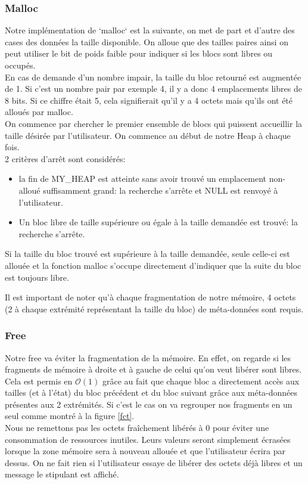 \documentclass{article}
\begin{document}
\subsubsection{Malloc}
Notre implémentation de `malloc` est la suivante, on met de part et d'autre des cases des données la taille disponible. On alloue que des tailles paires ainsi on peut utiliser le bit de poids faible pour indiquer si les blocs sont libres ou occupés.\\ 
En cas de demande d'un nombre impair, la taille du bloc retourné est augmentée de 1. Si c'est un nombre pair par exemple 4, il y a donc 4 emplacements libres de 8 bits. Si ce chiffre était 5, cela signifierait qu'il y a 4 octets mais qu'ils ont été alloués par malloc.\\
On commence par chercher le premier ensemble de blocs qui puissent accueillir la taille désirée par l'utilisateur. On commence au début de notre Heap à chaque fois.\\
2 critères d'arrêt sont considérés:
\begin{itemize}
    \item la fin de MY\_HEAP est atteinte sans avoir trouvé un emplacement non-alloué suffisamment grand: la recherche s'arrête et NULL est renvoyé à l'utilisateur.
    \item Un bloc libre de taille supérieure ou égale à la taille demandée est trouvé: la recherche s'arrête. \newline
\end{itemize}

Si la taille du bloc trouvé est supérieure à la taille demandée, seule celle-ci est allouée et la fonction malloc s'occupe directement d'indiquer que la suite du bloc est toujours libre.

Il est important de noter qu'à chaque fragmentation de notre mémoire, 4 octets (2 à chaque extrémité représentant la taille du bloc) de méta-données sont requis.

\subsubsection{Free}
\label{free}
Notre free va éviter la fragmentation de la mémoire. En effet, on regarde si les fragments de mémoire à droite et à gauche de celui qu'on veut libérer sont libres.
Cela est permis en $\mathcal{O}(1)$ grâce au fait que chaque bloc a directement accès aux tailles (et à l'état) du bloc précédent et du bloc suivant grâce aux méta-données présentes aux 2 extrémités.
Si c'est le cas on va regrouper nos fragments en un seul comme montré à la figure \ref{fct}.\\
Nous ne remettons pas les octets fraîchement libérés à 0 pour éviter une consommation de ressources inutiles. Leurs valeurs seront simplement écrasées lorsque la zone mémoire sera à nouveau allouée et que l'utilisateur écrira par dessus. On ne fait rien si l'utilisateur essaye de libérer des octets déjà libres et un message le stipulant est affiché.
\end{document}
